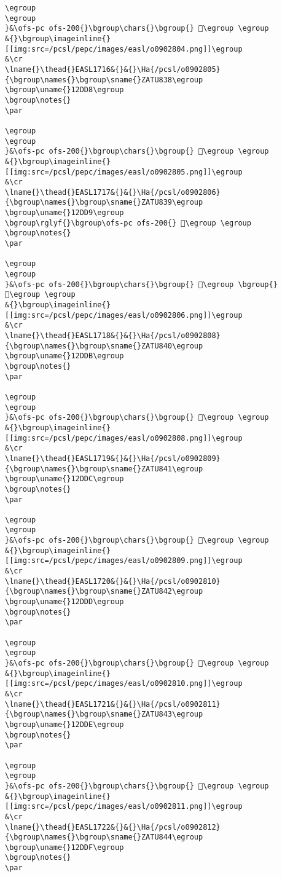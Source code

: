\begin{verbatim}
\egroup
\egroup
}&\ofs-pc ofs-200{}\bgroup\chars{}\bgroup{} 𒷗\egroup \egroup
&{}\bgroup\imageinline{}[[img:src=/pcsl/pepc/images/easl/o0902804.png]]\egroup
&\cr
\lname{}\thead{}EASL1716&{}&{}\Ha{/pcsl/o0902805}{\bgroup\names{}\bgroup\sname{}ZATU838\egroup
\bgroup\uname{}12DD8\egroup
\bgroup\notes{}
\par 

\egroup
\egroup
}&\ofs-pc ofs-200{}\bgroup\chars{}\bgroup{} 𒷘\egroup \egroup
&{}\bgroup\imageinline{}[[img:src=/pcsl/pepc/images/easl/o0902805.png]]\egroup
&\cr
\lname{}\thead{}EASL1717&{}&{}\Ha{/pcsl/o0902806}{\bgroup\names{}\bgroup\sname{}ZATU839\egroup
\bgroup\uname{}12DD9\egroup
\bgroup\rglyf{}\bgroup\ofs-pc ofs-200{} 𒷙\egroup \egroup
\bgroup\notes{}
\par 

\egroup
\egroup
}&\ofs-pc ofs-200{}\bgroup\chars{}\bgroup{} 𒷙\egroup \bgroup{} 𒷚\egroup \egroup
&{}\bgroup\imageinline{}[[img:src=/pcsl/pepc/images/easl/o0902806.png]]\egroup
&\cr
\lname{}\thead{}EASL1718&{}&{}\Ha{/pcsl/o0902808}{\bgroup\names{}\bgroup\sname{}ZATU840\egroup
\bgroup\uname{}12DDB\egroup
\bgroup\notes{}
\par 

\egroup
\egroup
}&\ofs-pc ofs-200{}\bgroup\chars{}\bgroup{} 𒷛\egroup \egroup
&{}\bgroup\imageinline{}[[img:src=/pcsl/pepc/images/easl/o0902808.png]]\egroup
&\cr
\lname{}\thead{}EASL1719&{}&{}\Ha{/pcsl/o0902809}{\bgroup\names{}\bgroup\sname{}ZATU841\egroup
\bgroup\uname{}12DDC\egroup
\bgroup\notes{}
\par 

\egroup
\egroup
}&\ofs-pc ofs-200{}\bgroup\chars{}\bgroup{} 𒷜\egroup \egroup
&{}\bgroup\imageinline{}[[img:src=/pcsl/pepc/images/easl/o0902809.png]]\egroup
&\cr
\lname{}\thead{}EASL1720&{}&{}\Ha{/pcsl/o0902810}{\bgroup\names{}\bgroup\sname{}ZATU842\egroup
\bgroup\uname{}12DDD\egroup
\bgroup\notes{}
\par 

\egroup
\egroup
}&\ofs-pc ofs-200{}\bgroup\chars{}\bgroup{} 𒷝\egroup \egroup
&{}\bgroup\imageinline{}[[img:src=/pcsl/pepc/images/easl/o0902810.png]]\egroup
&\cr
\lname{}\thead{}EASL1721&{}&{}\Ha{/pcsl/o0902811}{\bgroup\names{}\bgroup\sname{}ZATU843\egroup
\bgroup\uname{}12DDE\egroup
\bgroup\notes{}
\par 

\egroup
\egroup
}&\ofs-pc ofs-200{}\bgroup\chars{}\bgroup{} 𒷞\egroup \egroup
&{}\bgroup\imageinline{}[[img:src=/pcsl/pepc/images/easl/o0902811.png]]\egroup
&\cr
\lname{}\thead{}EASL1722&{}&{}\Ha{/pcsl/o0902812}{\bgroup\names{}\bgroup\sname{}ZATU844\egroup
\bgroup\uname{}12DDF\egroup
\bgroup\notes{}
\par 


\end{verbatim}

